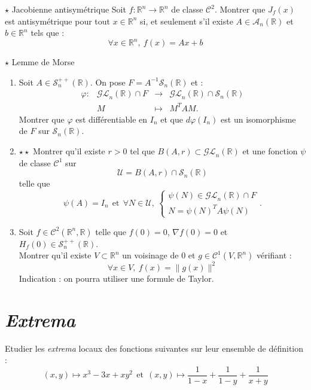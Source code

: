 \documentclass[french,a4paper]{article}
\newcommand{\R}{\mathbb{R}}
\newcommand{\inv}{^{-1}}
\theoremstyle{plain}
\theoremstyle{definition}
\theoremstyle{remark}
\begin{document}
\begin{ex}[Nougayrède / X]{$\star$ Jacobienne antisymétrique}
	Soit $f:\R^n\to\R^n$ de classe $\mathcal{C}^2$. Montrer que $J_f(x)$ est antisymétrique pour tout $x\in\R^n$ si, et seulement s'il existe $A\in\mathcal{A}_n(\R)$ et $b\in\R^n$ tels que : $$\forall x\in\R^n,\ f(x)=Ax+b$$
\end{ex}

\begin{ex}{$\star$ Lemme de Morse}
	\begin{enumerate}
		\item Soit $A\in\mathcal{S}_n^{++}(\R)$. On pose $F=A\inv\mathcal{S}_n(\R)$ et : $$\begin{array}{lrcl}
			\varphi:&\mathcal{GL}_n(\R)\cap F&\longrightarrow&\mathcal{GL}_n(\R)\cap\mathcal{S}_n(\R)\\
			&M&\longmapsto&M^TAM.
		\end{array}$$ Montrer que $\varphi$ est différentiable en $I_n$ et que $d\varphi(I_n)$ est un isomorphisme de $F$ sur $\mathcal{S}_n(\R)$.
		\item $\star\star$ Montrer qu'il existe $r>0$ tel que $B(A,r)\subset\mathcal{GL}_n(\R)$ et une fonction $\psi$ de classe $\mathcal{C}^1$ sur $$\mathcal{U}=B(A,r)\cap\mathcal{S}_n(\R)$$ telle que $$\psi(A)=I_n\ \ \text{et}\ \ \forall N\in \mathcal{U},\ \begin{cases}
			\psi(N)\in\mathcal{GL}_n(\R)\cap F\\
			N=\psi(N)^TA\psi(N)
		\end{cases}.$$
		\item Soit $f\in\mathcal{C}^2(\R^n,\R)$ telle que $f(0)=0$, $\nabla f(0)=0$ et $H_f(0)\in\mathcal{S}_n^{++}(\R)$. \\
		Montrer qu'il existe $V\subset\R^n$ un voisinage de $0$ et $g\in\mathcal{C}^1(V,\R^n)$ vérifiant : $$\forall x\in V,\ f(x)=\lVert g(x)\rVert^2$$ Indication : on pourra utiliser une formule de Taylor.
	\end{enumerate}
\end{ex}

\section{\textit{Extrema}}

\begin{ex}[Moulin.CD.32]{}
	Etudier les \textit{extrema} locaux des fonctions suivantes sur leur ensemble de définition : $$(x,y)\mapsto x^3-3x+xy^2 \ \ \text{et}\ \ (x,y)\mapsto\frac{1}{1-x}+\frac{1}{1-y}+\frac{1}{x+y}$$
\end{ex}
\end{document}

